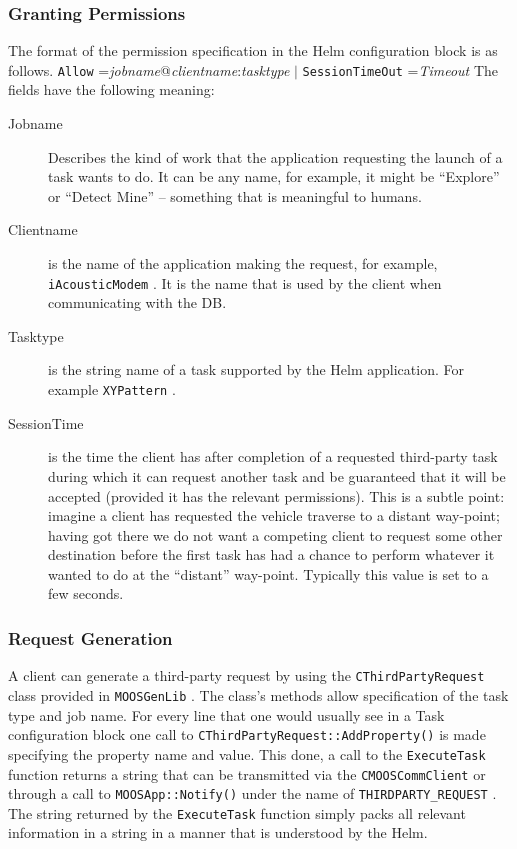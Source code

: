 \documentclass[a4paper,10pt]{article}
\newcommand{\Code}[1]{\texttt{#1} }
\newcommand{\code}[1]{\Code{#1} }
\begin{document}
\subsubsection{Granting Permissions}
The format of the permission specification in the Helm
configuration block is as follows.\newline
%
\code{Allow}={\it{jobname}}@{\it{clientname}}:{\it{tasktype}}
$\mid$ \code{SessionTimeOut}={\it{Timeout}}\newline
%
The fields have the following meaning:
\begin{description}
\item[Jobname]  Describes the kind of work that the application requesting
the launch of a task wants to do. It can be any name, for example,
it might be ``Explore'' or ``Detect Mine'' -- something that is
meaningful to humans.
%
\item[Clientname] is the name of the application making the request, for example,
\code{iAcousticModem}. It is the name that is used by the client
when communicating with the DB.
%
\item[Tasktype] is the string name of a task supported by the Helm
application. For example \code{XYPattern}.
%
\item[SessionTime] is the time the client has after
completion of a requested third-party task during which it can
request another task and be guaranteed that it will be accepted
(provided it has the relevant permissions). This is a subtle
point: imagine a client has requested the vehicle traverse to a
distant way-point; having got there we do not want  a competing
client to request some other destination before the first task has
had a chance to perform whatever it wanted to do at the
``distant'' way-point. Typically this value is set to a few
seconds.
\end{description}


\subsubsection{Request Generation}
A client can generate a third-party request by using the
\code{CThirdPartyRequest} class provided in \code{MOOSGenLib}. The
class's methods allow specification of the task type and job name.
For every line that one would usually see in a Task configuration
block one call to \code{CThirdPartyRequest::AddProperty()} is made
specifying the property name and value. This done, a call to the
\code{ExecuteTask} function returns a string that can be
transmitted via the \code{CMOOSCommClient} or through a call to
\code{MOOSApp::Notify()} under the name of
\code{THIRDPARTY\_REQUEST}. The string returned by the
\code{ExecuteTask} function simply packs all relevant information
in a string in a manner that is understood by the Helm.
\end{document}
